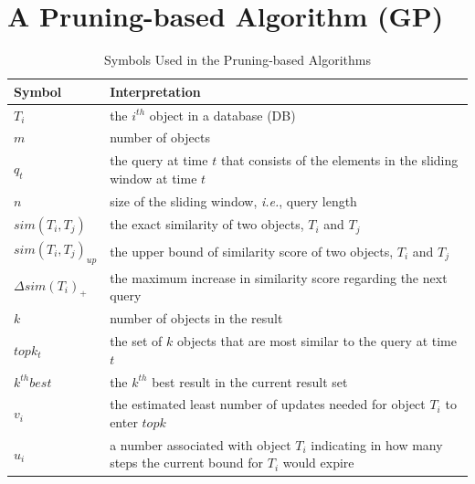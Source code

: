\section{A Pruning-based Algorithm (GP)}
\label{sec:pruning-method}

\begin{table}[t]
\centering
\caption{Symbols Used in the Pruning-based Algorithms}
\begin{tabular}{|l|p{11cm}|} \hline
      Symbol & Interpretation \\ \hline
      $T_i$ & the $i^{th}$ object in a database (DB)\\ \hline
      $m$ & number of objects \\ \hline
      $q_t$ & the query at time $t$ that consists of the elements in the sliding window at time $t$ \\ \hline
      $n$ & size of the sliding window, \emph{i.e.}, query length\\ \hline
      $sim(T_i,T_j)$ & the exact similarity of two objects, $T_i$ and $T_j$\\ \hline
      $sim(T_i, T_j)_{up}$ & the upper bound of similarity score of two objects, $T_i$ and $T_j$\\ \hline
      $\Delta sim(T_i)_{+}$ & the maximum increase in similarity score regarding the next query\\ \hline 
      $k$ & number of objects in the result \\ \hline
      $topk_{t}$ & the set of $k$ objects that are most similar to the query at time $t$\\ \hline
      $k^{th}best$ & the $k^{th}$ best result in the current result set\\ \hline
      $v_i$ & the estimated least number of updates needed for object $T_i$ to enter $topk$ \\ \hline
      $u_i$ & a number associated with object $T_i$ indicating in how many steps the current bound for $T_i$ would expire \\ \hline
\end{tabular}
  \label{Symbols}
\end{table}

